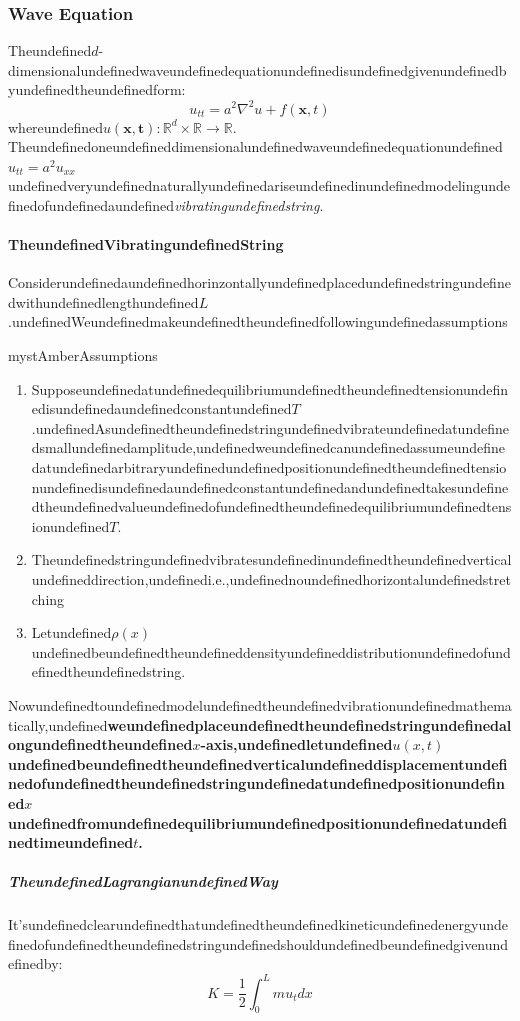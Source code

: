 \subsubsection{Wave Equation}

Theundefined$d$-dimensionalundefinedwaveundefinedequationundefinedisundefinedgivenundefinedbyundefinedtheundefinedform:
\begin{equation}
u_{tt} = a^2 \nabla^2 u + f(\mathbf{x},t)
\end{equation}
whereundefined$u(\mathbf{x,t}): \mathbb{R}^d\times \mathbb{R}\to \mathbb{R}$.\newline
Theundefinedoneundefineddimensionalundefinedwaveundefinedequationundefined$u_{tt}=a^2u_{xx}$undefinedveryundefinednaturallyundefinedariseundefinedinundefinedmodelingundefinedofundefinedaundefined\textit{vibratingundefinedstring}.

\paragraph{TheundefinedVibratingundefinedString}

Considerundefinedaundefinedhorinzontallyundefinedplacedundefinedstringundefinedwithundefinedlengthundefined$L$.undefinedWeundefinedmakeundefinedtheundefinedfollowingundefinedassumptions

\begin{mystadmonition}{mystAmber}{Assumptions}\begin{enumerate}
\item Supposeundefinedatundefinedequilibriumundefinedtheundefinedtensionundefinedisundefinedaundefinedconstantundefined$T$.undefinedAsundefinedtheundefinedstringundefinedvibrateundefinedatundefinedsmallundefinedamplitude,undefinedweundefinedcanundefinedassumeundefinedatundefinedarbitraryundefinedundefinedpositionundefinedtheundefinedtensionundefinedisundefinedaundefinedconstantundefinedandundefinedtakesundefinedtheundefinedvalueundefinedofundefinedtheundefinedequilibriumundefinedtensionundefined$T$.
\item Theundefinedstringundefinedvibratesundefinedinundefinedtheundefinedverticalundefineddirection,undefinedi.e.,undefinednoundefinedhorizontalundefinedstretching
\item Letundefined$\rho(x)$undefinedbeundefinedtheundefineddensityundefineddistributionundefinedofundefinedtheundefinedstring.
\end{enumerate}

\end{mystadmonition}
Nowundefinedtoundefinedmodelundefinedtheundefinedvibrationundefinedmathematically,undefined\textbf{weundefinedplaceundefinedtheundefinedstringundefinedalongundefinedtheundefined$x$-axis,undefinedletundefined$u(x,t)$undefinedbeundefinedtheundefinedverticalundefineddisplacementundefinedofundefinedtheundefinedstringundefinedatundefinedpositionundefined$x$undefinedfromundefinedequilibriumundefinedpositionundefinedatundefinedtimeundefined$t$.}

\subparagraph{TheundefinedLagrangianundefinedWay}

It'sundefinedclearundefinedthatundefinedtheundefinedkineticundefinedenergyundefinedofundefinedtheundefinedstringundefinedshouldundefinedbeundefinedgivenundefinedby:
\begin{equation}
K=\frac{1}{2}\int_0^L mu_tdx
\end{equation}